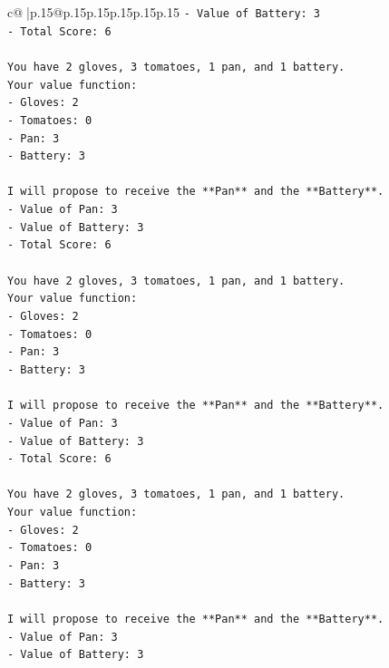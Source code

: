 \documentclass{article}
\begin{document}
{\begin{supertabular}{c@{$\;$}|p{.15\linewidth}@{}p{.15\linewidth}p{.15\linewidth}p{.15\linewidth}p{.15\linewidth}p{.15\linewidth}}
{{{\texttt{{-} Value of Battery: 3} \\
\texttt{{-} Total Score: 6} \\
\\ 
\texttt{You have 2 gloves, 3 tomatoes, 1 pan, and 1 battery.} \\
\texttt{Your value function:} \\
\texttt{{-} Gloves: 2} \\
\texttt{{-} Tomatoes: 0} \\
\texttt{{-} Pan: 3} \\
\texttt{{-} Battery: 3} \\
\\ 
\texttt{I will propose to receive the **Pan** and the **Battery**.} \\
\texttt{{-} Value of Pan: 3} \\
\texttt{{-} Value of Battery: 3} \\
\texttt{{-} Total Score: 6} \\
\\ 
\texttt{You have 2 gloves, 3 tomatoes, 1 pan, and 1 battery.} \\
\texttt{Your value function:} \\
\texttt{{-} Gloves: 2} \\
\texttt{{-} Tomatoes: 0} \\
\texttt{{-} Pan: 3} \\
\texttt{{-} Battery: 3} \\
\\ 
\texttt{I will propose to receive the **Pan** and the **Battery**.} \\
\texttt{{-} Value of Pan: 3} \\
\texttt{{-} Value of Battery: 3} \\
\texttt{{-} Total Score: 6} \\
\\ 
\texttt{You have 2 gloves, 3 tomatoes, 1 pan, and 1 battery.} \\
\texttt{Your value function:} \\
\texttt{{-} Gloves: 2} \\
\texttt{{-} Tomatoes: 0} \\
\texttt{{-} Pan: 3} \\
\texttt{{-} Battery: 3} \\
\\ 
\texttt{I will propose to receive the **Pan** and the **Battery**.} \\
\texttt{{-} Value of Pan: 3} \\
\texttt{{-} Value of Battery: 3} \\
}}}
\end{supertabular}}
\end{document}
